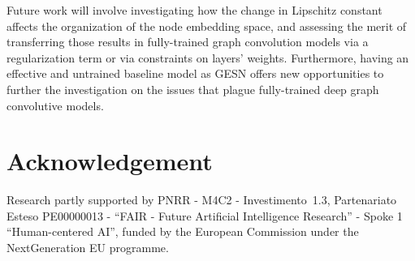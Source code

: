 \documentclass[final,5p,times,twocolumn]{elsarticle}
\begin{document}
Future work will involve investigating how the change in Lipschitz constant affects the organization of the node embedding space, and assessing the merit of transferring those results in fully-trained graph convolution models via a regularization term or via constraints on layers' weights.
Furthermore, having an effective and untrained baseline model as GESN offers new opportunities to further the investigation on the issues that plague fully-trained deep graph convolutive models.

\section*{Acknowledgement}
Research partly supported by PNRR - M4C2 - Investimento~1.3, Partenariato Esteso PE00000013 - ``FAIR - Future Artificial Intelligence Research'' - Spoke 1 ``Human-centered AI'', funded by the European Commission under the NextGeneration EU programme.




 
 
\end{document}

